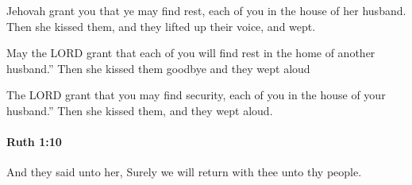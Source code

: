 			\begin{versebox}
					\item[BHS] 
					\item[LXX] 
					\item[ASV] Jehovah grant you that ye may find rest, each of you in the house of her husband. Then she kissed them, and they lifted up their voice, and wept.
					\item[NIV] May the LORD grant that each of you will find rest in the home of another husband.” Then she kissed them goodbye and they wept aloud
					\item[NRSV] The LORD grant that you may find security, each of you in the house of your husband.” Then she kissed them, and they wept aloud.
			\end{versebox}

		\paragraph{Ruth 1:10} %
			\label{RUTH-1-10}

			And they said unto her, Surely we will return with thee unto thy people.

